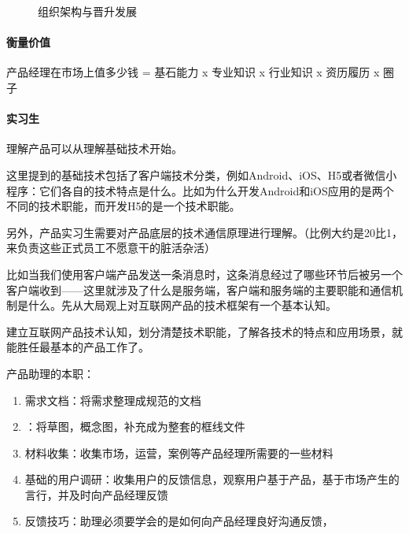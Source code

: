 \documentclass[letterpaper,11pt,english]{sphinxmanual}
\begin{document}
\begin{figure}[H]
\centering
\capstart

\noindent{}
\caption{组织架构与晋升发展}\label{\detokenize{chapter_experience/career_path:id25}}\end{figure}


\paragraph{衡量价值}
\label{\detokenize{chapter_experience/career_path:id6}}
产品经理在市场上值多少钱 = 基石能力 x 专业知识 x 行业知识 x 资历履历 x
圈子%
\begin{footnote}[599]\sphinxAtStartFootnote
{}
%
\end{footnote}


\paragraph{实习生}
\label{\detokenize{chapter_experience/career_path:id7}}\label{\detokenize{chapter_experience/career_path:id8}}
理解产品可以从理解基础技术开始。

这里提到的基础技术包括了客户端技术分类，例如Android、iOS、H5或者微信小程序：它们各自的技术特点是什么。比如为什么开发Android和iOS应用的是两个不同的技术职能，而开发H5的是一个技术职能。

另外，产品实习生需要对产品底层的技术通信原理进行理解。（比例大约是20比1，来负责这些正式员工不愿意干的脏活杂活）

比如当我们使用客户端产品发送一条消息时，这条消息经过了哪些环节后被另一个客户端收到——这里就涉及了什么是服务端，客户端和服务端的主要职能和通信机制是什么。先从大局观上对互联网产品的技术框架有一个基本认知。

建立互联网产品技术认知，划分清楚技术职能，了解各技术的特点和应用场景，就能胜任最基本的产品工作了。

产品助理的本职： %
\begin{footnote}[600]\sphinxAtStartFootnote
{}
%
\end{footnote}
\begin{enumerate}
%
\item {} 
需求文档：将需求整理成规范的文档

\item {} 
：将草图，概念图，补充成为整套的框线文件

\item {} 
材料收集：收集市场，运营，案例等产品经理所需要的一些材料

\item {} 
基础的用户调研：收集用户的反馈信息，观察用户基于产品，基于市场产生的言行，并及时向产品经理反馈

\item {} 
反馈技巧：助理必须要学会的是如何向产品经理良好沟通反馈，

\end{enumerate}
\end{document}
